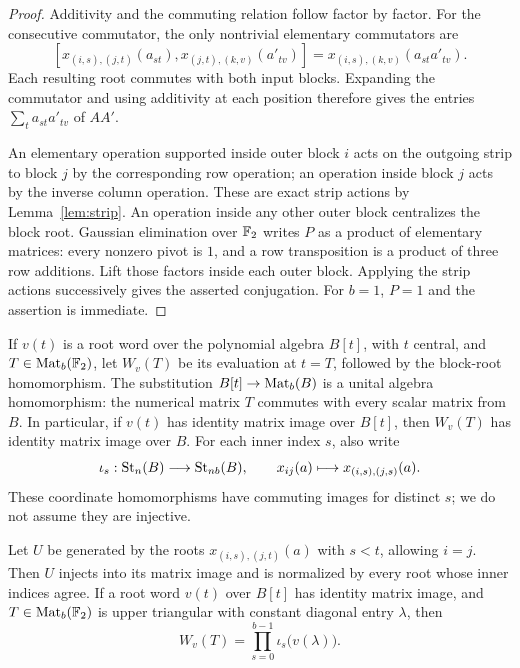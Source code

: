 \begin{proof}
Additivity and the commuting relation follow factor by factor.
For the consecutive commutator, the only nontrivial elementary
commutators are
\[
 [x_{(i,s),(j,t)}(a_{st}),
   x_{(j,t),(k,v)}(a'_{tv})]
   =x_{(i,s),(k,v)}(a_{st}a'_{tv}).
\]
Each resulting root commutes with both input blocks.  Expanding the
commutator and using additivity at each position therefore gives
the entries $\sum_t a_{st}a'_{tv}$ of $AA'$.

An elementary operation supported inside outer block $i$ acts on
the outgoing strip to block $j$ by the corresponding row operation;
an operation inside block $j$ acts by the inverse column operation.
These are exact strip actions by Lemma~\ref{lem:strip}.  An operation
inside any other outer block centralizes the block root.  Gaussian
elimination over $\mathbb F_2$ writes $P$ as a product of elementary
matrices: every nonzero pivot is $1$, and a row transposition is
a product of three row additions.  Lift those factors inside each
outer block.  Applying the strip actions successively gives the
asserted conjugation.  For $b=1$, $P=1$ and the assertion is immediate.
\end{proof}

If $v(t)$ is a root word over the polynomial algebra $B[t]$, with
$t$ central, and $T\in\operatorname{Mat}_b(\mathbb F_2)$, let $W_v(T)$ be its evaluation
at $t=T$, followed by the block-root homomorphism.  The substitution
$B[t]\to\operatorname{Mat}_b(B)$ is a unital algebra homomorphism: the numerical
matrix $T$ commutes with every scalar matrix from $B$.
In particular, if $v(t)$ has identity matrix image over $B[t]$,
then $W_v(T)$ has identity matrix image over $B$.
For each inner index $s$, also write
\[
 \iota_s:\operatorname{St}_n(B)\longrightarrow\operatorname{St}_{nb}(B),\qquad
 x_{ij}(a)\longmapsto x_{(i,s),(j,s)}(a).
\]
These coordinate homomorphisms have commuting images for distinct
$s$; we do not assume they are injective.

\begin{lemma}\label{lem:triangular}
Let $U$ be generated by the roots
$x_{(i,s),(j,t)}(a)$ with $s<t$, allowing $i=j$.
Then $U$ injects into its matrix image and is normalized by every
root whose inner indices agree.  If a root word $v(t)$ over $B[t]$
has identity matrix image, and $T\in\operatorname{Mat}_b(\mathbb F_2)$ is upper
triangular with constant diagonal entry $\lambda$, then
\begin{equation}\label{eq:triangular-evaluation}
 W_v(T)=\prod_{s=0}^{b-1}\iota_s\bigl(v(\lambda)\bigr).
\end{equation}
\end{lemma}

